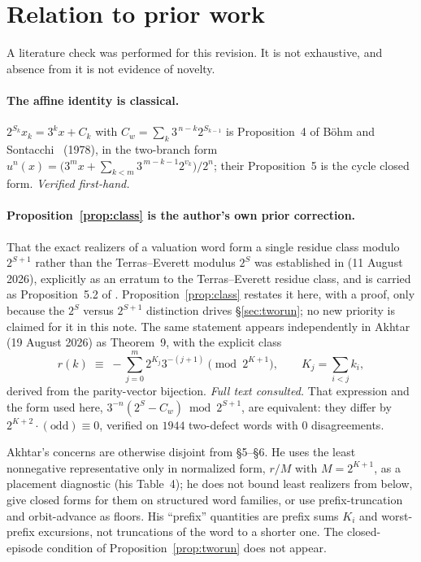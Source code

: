 \documentclass[11pt,a4paper]{article}
\theoremstyle{plain}
\theoremstyle{definition}
\begin{document}
\section{Relation to prior work}\label{sec:lit}

A literature check was performed for this revision. It is not exhaustive, and
absence from it is not evidence of novelty.

\paragraph{The affine identity is classical.}
$2^{S_k}x_k=3^{k}x+C_k$ with $C_w=\sum_k 3^{\,n-k}2^{S_{k-1}}$ is
Proposition~4 of B\"ohm and Sontacchi~\cite{bohmsontacchi} (1978), in the
two-branch form $u^{n}(x)=\bigl(3^{m}x+\sum_{k<m}3^{\,m-k-1}2^{v_k}\bigr)/2^{n}$;
their Proposition~5 is the cycle closed form. \emph{Verified first-hand.}

\paragraph{Proposition~\ref{prop:class} is the author's own prior correction.}
That the exact realizers of a valuation word form a single residue class modulo
$2^{S+1}$ rather than the Terras--Everett modulus $2^{S}$ was established in
\cite{dejesus-erratum} (11 August 2026), explicitly as an erratum to the
Terras--Everett residue class, and is carried as Proposition~5.2 of
\cite{dejesus-eoc}. Proposition~\ref{prop:class} restates it here, with a proof,
only because the $2^{S}$ versus $2^{S+1}$ distinction drives
\S\ref{sec:tworun}; no new priority is claimed for it in this note.
The same statement appears independently in
Akhtar~\cite{akhtar2026} (19 August 2026) as Theorem~9, with the explicit class
\[
r(k)\;\equiv\;-\sum_{j=0}^{m}2^{K_j}3^{-(j+1)}\pmod{2^{K+1}},
\qquad K_j=\textstyle\sum_{i<j}k_i ,
\]
derived from the parity-vector bijection. \emph{Full text consulted.} That
expression and the form used here, $3^{-n}(2^{S}-C_w)\bmod 2^{S+1}$, are
equivalent: they differ by $2^{K+2}\cdot(\text{odd})\equiv0$, verified on $1944$
two-defect words with $0$ disagreements.

Akhtar's concerns are otherwise disjoint from \S5--\S6. He uses the least
nonnegative representative only in normalized form, $r/M$ with $M=2^{K+1}$, as a
placement diagnostic (his Table~4); he does not bound least realizers from
below, give closed forms for them on structured word families, or use
prefix-truncation and orbit-advance as floors. His ``prefix'' quantities are
prefix sums $K_i$ and worst-prefix excursions, not truncations of the word to a
shorter one. The closed-episode condition of
Proposition~\ref{prop:tworun} does not appear.
\end{document}
